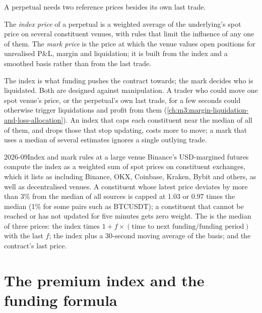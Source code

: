 A perpetual needs two reference prices besides its own last trade.

\begin{definition}\label{def:m3:perpetual-futures:index}
The \emph{index price} of a perpetual is a weighted average of the underlying's spot price
on several constituent venues, with rules that limit the influence of any one of them. The \emph{mark
price} is the price at which the venue values open positions for unrealised P\&L, margin
and liquidation; it is built from the index and a smoothed basis rather than from the last trade.
\end{definition}

The index is what funding pushes the contract towards; the mark decides who is liquidated. Both are designed
against manipulation. A trader who could move one spot venue's price, or the perpetual's own last trade, for
a few seconds could otherwise trigger liquidations and profit from them
(\cref{ch:m3:margin-liquidation-and-loss-allocation}). An index that caps each constituent near the median of
all of them, and drops those that stop updating, costs more to move; a mark that uses a median of several
estimates ignores a single outlying trade.

\begin{dated}{2026-09}{Index and mark rules at a large venue}\label{dat:m3:perpetual-futures:mark}
Binance's USD-margined futures compute the index as a weighted sum of spot
prices on constituent exchanges, which it lists as including Binance, OKX, Coinbase, Kraken, Bybit and others,
as well as decentralised venues. A constituent whose latest price deviates by more than 3\% from the median of
all sources is capped at 1.03 or 0.97 times the median (1\% for some pairs such as BTCUSDT); a constituent that
cannot be reached or has not updated for five minutes gets zero weight. The  is the median of three
prices: the index times $1 + f \times (\text{time to next funding}/\text{funding period})$ with the last  $f$; the index plus a 30-second moving average of the basis; and the contract's last price.
\end{dated}

\section{The premium index and the funding formula}

